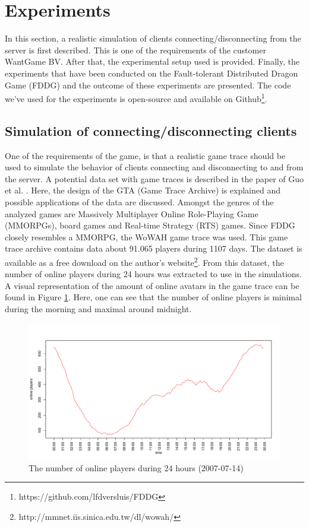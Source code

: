 \section{Experiments}
\label{sec:experiments}
	In this section, a realistic simulation of clients connecting/disconnecting from the server is first described. This is one of the requirements of the customer WantGame BV. After that, the experimental setup used is provided. Finally, the experiments that have been conducted on the Fault-tolerant Distributed Dragon Game (FDDG) and the outcome of these experiments are presented. The code we've used for the experiments is open-source and available on Github\footnote{https://github.com/lfdversluis/FDDG}.
	
\subsection{Simulation of connecting/disconnecting clients}
\label{subsec:simulation_clients}
One of the requirements of the game, is that a realistic game trace should be used to simulate the behavior of clients connecting and disconnecting to and from the server.
A potential data set with game traces is described in the paper of Guo et al. \cite{guo2012game}.
Here, the design of the GTA (Game Trace Archive) is explained and possible applications of the data are discussed.
Amongst the genres of the analyzed games are Massively Multiplayer Online Role-Playing Game (MMORPGs), board games and Real-time Strategy (RTS) games. 
Since FDDG closely resembles a MMORPG, the WoWAH game trace \cite{lee2011world} was used.
This game trace archive contains data about 91.065 players during 1107 days. The dataset is available as a free download on the author's website\footnote{http://mmnet.iis.sinica.edu.tw/dl/wowah/}.
From this dataset, the number of online players during 24 hours was extracted to use in the simulations. 
A visual representation of the amount of online avatars in the game trace can be found in Figure \ref{fig:online_players_plot}. Here, one can see that the number of online players is minimal during the morning and maximal around midnight.

\begin{figure}[h!]
  \centering
    \includegraphics[width=\textwidth]{images/online_players_plot}
    
  \caption{The number of online players during 24 hours (2007-07-14)}
  \label{fig:online_players_plot}
\end{figure}

